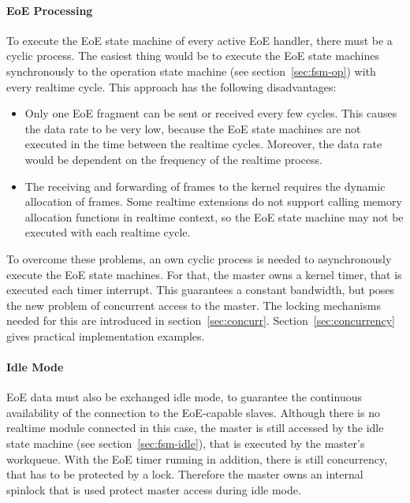\documentclass[a4paper,12pt,BCOR6mm,bibtotoc,idxtotoc]{scrbook}
\begin{document}
\paragraph{EoE Processing}

To execute the EoE state machine of every active EoE handler, there
must be a cyclic process. The easiest thing would be to execute the
EoE state machines synchronously to the operation state machine (see
section~\ref{sec:fsm-op}) with every realtime cycle. This approach has
the following disadvantages:

\begin{itemize}
\item Only one EoE fragment can be sent or received every few cycles.
  This causes the data rate to be very low, because the EoE state
  machines are not executed in the time between the realtime
  cycles. Moreover, the data rate would be dependent on the frequency
  of the realtime process.
\item The receiving and forwarding of frames to the kernel requires
  the dynamic allocation of frames. Some realtime extensions do not
  support calling memory allocation functions in realtime context, so
  the EoE state machine may not be executed with each realtime cycle.
\end{itemize}

To overcome these problems, an own cyclic process is needed to
asynchronously execute the EoE state machines. For that, the master
owns a kernel timer, that is executed each timer interrupt. This
guarantees a constant bandwidth, but poses the new problem of
concurrent access to the master. The locking mechanisms needed for
this are introduced in section~\ref{sec:concurr}.
Section~\ref{sec:concurrency} gives practical implementation examples.

\paragraph{Idle Mode}

EoE data must also be exchanged idle mode, to guarantee the continuous
availability of the connection to the EoE-capable slaves. Although
there is no realtime module connected in this case, the master is
still accessed by the idle state machine (see
section~\ref{sec:fsm-idle}), that is executed by the master's
workqueue. With the EoE timer running in addition, there is still
concurrency, that has to be protected by a lock. Therefore the master
owns an internal spinlock that is used protect master access during
idle mode.
\end{document}

